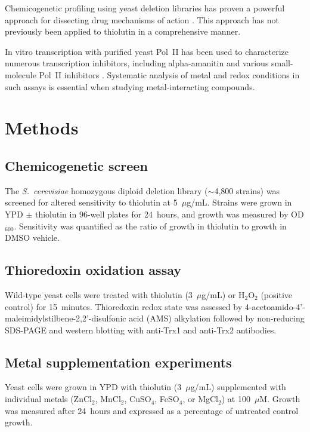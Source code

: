 \documentclass[11pt]{article}
\begin{document}
Chemicogenetic profiling using yeast deletion libraries has proven a powerful approach for dissecting drug mechanisms of action \citep{giaever2004,hoepfner2014}. This approach has not previously been applied to thiolutin in a comprehensive manner.

In vitro transcription with purified yeast Pol~II has been used to characterize numerous transcription inhibitors, including alpha-amanitin \citep{bushnell2002} and various small-molecule Pol~II inhibitors \citep{bensaude2011}. Systematic analysis of metal and redox conditions in such assays is essential when studying metal-interacting compounds.

\section{Methods}

\subsection{Chemicogenetic screen}

The \textit{S.~cerevisiae} homozygous diploid deletion library ($\sim$4,800 strains) was screened for altered sensitivity to thiolutin at 5~$\mu$g/mL. Strains were grown in YPD $\pm$ thiolutin in 96-well plates for 24~hours, and growth was measured by OD$_{600}$. Sensitivity was quantified as the ratio of growth in thiolutin to growth in DMSO vehicle.

\subsection{Thioredoxin oxidation assay}

Wild-type yeast cells were treated with thiolutin (3~$\mu$g/mL) or H$_2$O$_2$ (positive control) for 15~minutes. Thioredoxin redox state was assessed by 4-acetoamido-4'-maleimidylstilbene-2,2'-disulfonic acid (AMS) alkylation followed by non-reducing SDS-PAGE and western blotting with anti-Trx1 and anti-Trx2 antibodies.

\subsection{Metal supplementation experiments}

Yeast cells were grown in YPD with thiolutin (3~$\mu$g/mL) supplemented with individual metals (ZnCl$_2$, MnCl$_2$, CuSO$_4$, FeSO$_4$, or MgCl$_2$) at 100~$\mu$M. Growth was measured after 24~hours and expressed as a percentage of untreated control growth.
\end{document}
